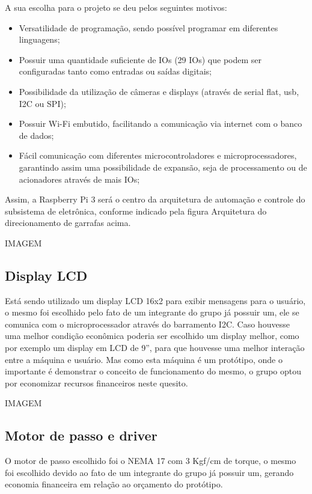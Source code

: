 A sua escolha para o projeto se deu pelos seguintes motivos:

\begin{itemize}
    \item Versatilidade de programação, sendo possível programar em diferentes linguagens;
    \item Possuir uma quantidade suficiente de IOs (29 IOs) que podem ser configuradas tanto como entradas ou saídas digitais;
    \item Possibilidade da utilização de câmeras e displays (através de serial flat, usb, I2C ou SPI);
    \item Possuir Wi-Fi embutido, facilitando a comunicação via internet com o banco de dados;
    \item Fácil comunicação com diferentes microcontroladores e microprocessadores, garantindo assim uma possibilidade de  expansão, seja de processamento ou de acionadores através de mais IOs;
\end{itemize}

Assim, a Raspberry Pi 3 será o centro da arquitetura de automação e controle do subsistema de eletrônica, conforme indicado pela figura {\color{red} Arquitetura do direcionamento de garrafas} acima.

IMAGEM

\subsection{Display LCD}
Está sendo utilizado um display LCD 16x2 para exibir mensagens para o usuário, o mesmo foi escolhido pelo fato de um integrante do grupo já possuir um, ele se comunica com o microprocessador através do barramento I2C. Caso houvesse uma melhor condição econômica poderia ser escolhido um display melhor, como por exemplo um display em LCD de 9”, para que houvesse uma melhor interação entre a máquina e usuário. Mas como esta máquina é um protótipo, onde o importante é demonstrar o conceito de funcionamento do mesmo, o grupo optou por economizar recursos financeiros neste quesito.

IMAGEM

\subsection{Motor de passo e driver}
O motor de passo escolhido foi o NEMA 17 com 3 Kgf/cm de torque, o mesmo foi escolhido devido ao fato de um integrante do grupo já possuir um, gerando economia financeira em relação ao orçamento do protótipo.

